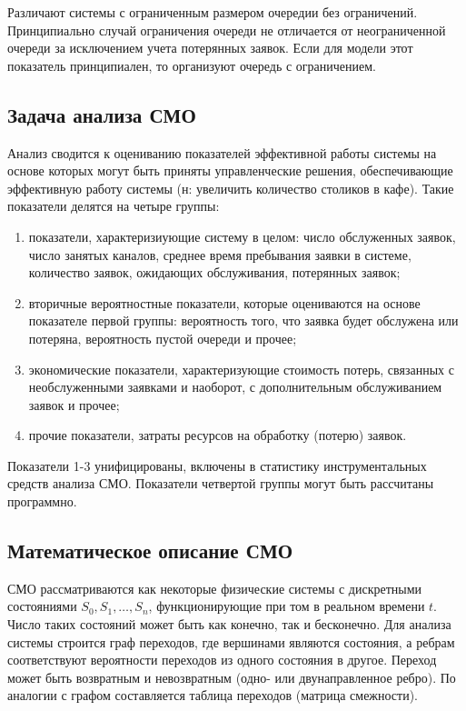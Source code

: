 \documentclass[12pt]{article}
\begin{document}
Различают системы с ограниченным размером очередии без ограничений. Принципиально случай ограничения очереди не отличается от неограниченной очереди за исключением учета потерянных заявок. Если для модели этот показатель принципиален, то организуют очередь с ограничением.

\subsection{Задача анализа СМО}
Анализ сводится к оцениванию показателей эффективной работы системы на основе которых могут быть приняты управленческие решения, обеспечивающие эффективную работу системы (н: увеличить количество столиков в кафе). Такие показатели делятся на четыре группы:
\begin{enumerate}
    \item показатели, характеризиующие систему в целом: число обслуженных заявок, число занятых каналов, среднее время пребывания заявки в системе, количество заявок, ожидающих обслуживания, потерянных заявок;
    \item вторичные вероятностные показатели, которые оцениваются на основе показателе первой группы: вероятность того, что заявка будет обслужена или потеряна, вероятность пустой очереди и прочее;  
    \item экономические показатели, характеризующие стоимость потерь, связанных с необслуженными заявками и наоборот, с дополнительным обслуживанием заявок и прочее;
    \item прочие показатели, затраты ресурсов на обработку (потерю) заявок.
\end{enumerate}
Показатели 1-3 унифицированы, включены в статистику инструментальных средств анализа СМО. Показатели четвертой группы могут быть рассчитаны программно.

\subsection{Математическое описание СМО}
СМО рассматриваются как некоторые физические системы с дискретными состояниями $S_0, S_1, \ldots, S_n$, функционирующие при том в реальном времени $t$. Число таких состояний может быть как конечно, так и бесконечно. Для анализа системы строится граф переходов, где вершинами являются состояния, а ребрам соответствуют вероятности переходов из одного состояния в другое. Переход может быть возвратным и невозвратным (одно- или двунаправленное ребро). По аналогии с графом составляется таблица переходов (матрица смежности).
\end{document}
